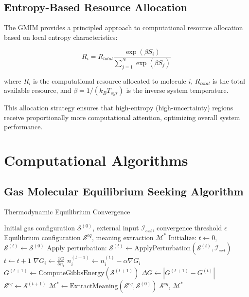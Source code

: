 \documentclass[11pt,a4paper]{article}
\begin{document}
\subsection{Entropy-Based Resource Allocation}

The GMIM provides a principled approach to computational resource allocation based on local entropy characteristics:

\begin{equation}
R_i = R_{total} \frac{\exp(\beta S_i)}{\sum_{j=1}^{N} \exp(\beta S_j)}
\end{equation}

where $R_i$ is the computational resource allocated to molecule $i$, $R_{total}$ is the total available resource, and $\beta = 1/(k_B T_{sys})$ is the inverse system temperature.

This allocation strategy ensures that high-entropy (high-uncertainty) regions receive proportionally more computational attention, optimizing overall system performance.

\section{Computational Algorithms}

\subsection{Gas Molecular Equilibrium Seeking Algorithm}

\begin{algorithm}
\caption{Thermodynamic Equilibrium Convergence}
\begin{algorithmic}[1]
\REQUIRE Initial gas configuration $\mathcal{S}^{(0)}$, external input $\mathcal{I}_{ext}$, convergence threshold $\epsilon$
\ENSURE Equilibrium configuration $\mathcal{S}^{eq}$, meaning extraction $\mathcal{M}^*$
\STATE Initialize: $t \leftarrow 0$, $\mathcal{S}^{(t)} \leftarrow \mathcal{S}^{(0)}$
\STATE Apply perturbation: $\mathcal{S}^{(t)} \leftarrow \text{ApplyPerturbation}(\mathcal{S}^{(t)}, \mathcal{I}_{ext})$
\REPEAT
    \STATE $t \leftarrow t + 1$
        \STATE $\nabla G_i \leftarrow \frac{\partial G}{\partial n_i}$
        \STATE $n_i^{(t+1)} \leftarrow n_i^{(t)} - \alpha \nabla G_i$
    \ENDFOR
    \STATE $G^{(t+1)} \leftarrow \text{ComputeGibbsEnergy}(\mathcal{S}^{(t+1)})$
    \STATE $\Delta G \leftarrow |G^{(t+1)} - G^{(t)}|$
\STATE $\mathcal{S}^{eq} \leftarrow \mathcal{S}^{(t+1)}$
\STATE $\mathcal{M}^* \leftarrow \text{ExtractMeaning}(\mathcal{S}^{eq}, \mathcal{S}^{(0)})$
\RETURN $\mathcal{S}^{eq}$, $\mathcal{M}^*$
\end{algorithmic}
\end{algorithm}
\end{document}
